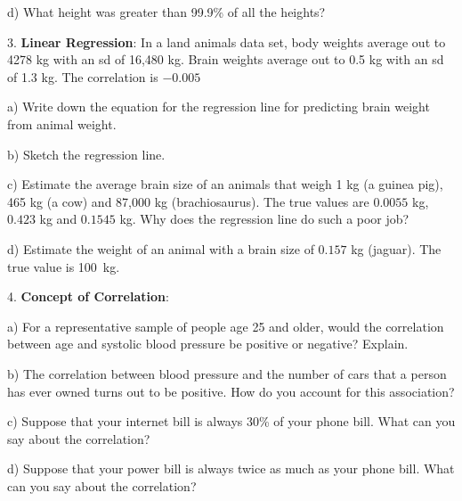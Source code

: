 \documentclass[10pt]{article}
\begin{document}
\hspace{10pt} d) What height was greater than 99.9\% of all the heights?
\vfill
\eject

3. \textbf{Linear Regression}:
In a land animals data set, body weights  average out to 4278 kg with an sd of 16,480 kg.
Brain weights average out to 0.5 kg with an sd of 1.3 kg. The correlation is $-0.005$

\hspace{20pt} a) Write down the equation for the regression line for predicting brain weight
from animal weight.
\vspace{1.0in}

\hspace{20pt} b) Sketch the regression line. 
\vspace{1.25in}

\hspace{20pt} c) 
Estimate the average brain size of an animals that weigh 1 kg (a guinea pig),
465 kg (a cow) and 87,000 kg (brachiosaurus).  The true values are $0.0055$ kg, $0.423$ kg and $0.1545$ kg.
Why does the regression line do such a poor job?
\vspace{2.75in}

\hspace{20pt} d) Estimate the weight of an animal with a brain size of $0.157$ kg (jaguar).
The true value is  100~kg.
\vfill
\eject

4. \textbf{Concept of Correlation}:

\hspace{20pt} a) For a representative sample of people age 25 and older, would the correlation between
age and systolic blood pressure be positive or negative?  Explain.
\vspace{.5in}

\hspace{20pt} b) The correlation between blood pressure and the number of cars that a person has ever owned 
turns out to be positive.
How do you account for this association?
\vspace{.5in}

\hspace{20pt} c)  Suppose that your internet bill is always 30\% of your phone bill.
What can you say about the correlation?
\vspace{.5in}

\hspace{20pt} d)  Suppose that your power bill is always twice as much as your phone bill.
What can you say about the correlation?
\vspace{.5in}
\end{document}
